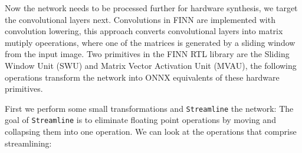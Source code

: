 \documentclass[11pt]{article}
\begin{document}
Now the network needs to be processed further for hardware synthesis, we target the convolutional layers next.
Convolutions in FINN are implemented with convolution lowering, this approach converts convolutional layers into matrix mutiply opeerations, where one of the matrices is generated by a sliding window from the input image.
Two primitives in the FINN RTL library are the Sliding Window Unit (SWU) and Matrix Vector Activation Unit (MVAU), the following operations transform the network into ONNX equivalents of these hardware primitives.

First we perform some small transformations and \verb+Streamline+ the network:
The goal of \verb+Streamline+ is to eliminate floating point operations by moving and collapsing them into one operation.
We can look at the operations that comprise streamlining:
\end{document}
